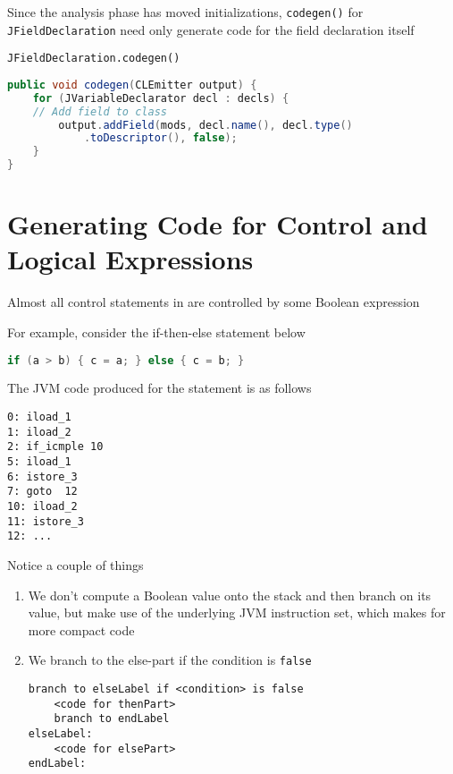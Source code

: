 \documentclass[8pt,a4paper,compress]{beamer}
\begin{document}
\begin{frame}[fragile]
\pause

Since the analysis phase has moved initializations, \lstinline{codegen()} for \lstinline{JFieldDeclaration} need only generate code for the field declaration itself

\pause
\bigskip

\lstinline{JFieldDeclaration.codegen()}

\smallskip

\begin{lstlisting}[language=Java,style=focusin]
public void codegen(CLEmitter output) {
    for (JVariableDeclarator decl : decls) {
	// Add field to class
        output.addField(mods, decl.name(), decl.type()
            .toDescriptor(), false);
    }
}
\end{lstlisting}
\end{frame}

\section{Generating Code for Control and Logical Expressions}
\begin{frame}[fragile]
\pause

Almost all control statements in \jmm are controlled by some Boolean expression

\pause
\bigskip

For example, consider the if-then-else statement below

\smallskip

\begin{lstlisting}[language=Java,style=focusin]
if (a > b) { c = a; } else { c = b; }
\end{lstlisting}

The JVM code produced for the statement is as follows

\smallskip

\begin{lstlisting}[language={},style=focusin]
0: iload_1
1: iload_2
2: if_icmple 10
5: iload_1
6: istore_3
7: goto  12
10: iload_2
11: istore_3
12: ...
\end{lstlisting}

\pause
\bigskip

Notice a couple of things
\begin{enumerate}
\pause
\item We don't compute a Boolean value onto the stack and then branch on its value, but make use of the underlying JVM instruction set, which makes for more compact code

\pause
\item We branch to the else-part if the condition is \lstinline{false}

\smallskip

\begin{lstlisting}[language={},style=focusin]
branch to elseLabel if <condition> is false
    <code for thenPart>
    branch to endLabel
elseLabel:
    <code for elsePart>
endLabel:
\end{lstlisting}
\end{enumerate}
\end{frame}
\end{document}
